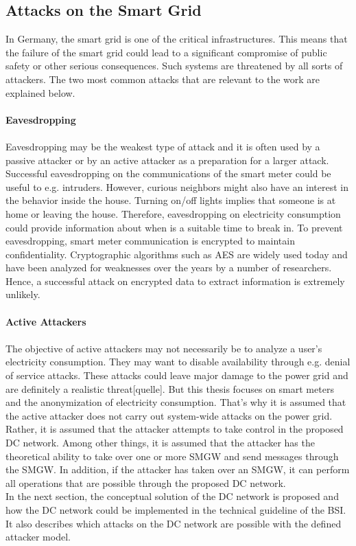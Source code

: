 \subsection{Attacks on the Smart Grid}
In Germany, the smart grid is one of the critical infrastructures. This means that the failure of the smart grid could lead to a significant compromise of public safety or other serious consequences. Such systems are threatened by all sorts of attackers. The two most common attacks that are relevant to the work are explained below.
\\
\\
\textbf{Eavesdropping}
\\
\\
Eavesdropping may be the weakest type of attack and it is often used by a passive attacker or by an active attacker as a preparation for a larger attack. Successful eavesdropping on the communications of the smart meter could be useful to e.g. intruders. However, curious neighbors might also have an interest in the behavior inside the house. Turning on/off lights implies that someone is at home or leaving the house. Therefore, eavesdropping on electricity consumption could provide information about when is a suitable time to break in. To prevent eavesdropping, smart meter communication is encrypted to maintain confidentiality. Cryptographic algorithms such as AES are widely used today and have been analyzed for weaknesses over the years by a number of researchers. Hence, a successful attack on encrypted data to extract information is extremely unlikely.
\\
\\
\textbf{Active Attackers}
\\
\\
The objective of active attackers may not necessarily be to analyze a user's electricity consumption. They may want to disable availability through e.g. denial of service attacks. These attacks could leave major damage to the power grid and are definitely a realistic threat[quelle]. But this thesis focuses on smart meters and the anonymization of electricity consumption. That's why it is assumed that the active attacker does not carry out system-wide attacks on the power grid. Rather, it is assumed that the attacker attempts to take control in the proposed DC network. Among other things, it is assumed that the attacker has the theoretical ability to take over one or more SMGW and send messages through the SMGW. In addition, if the attacker has taken over an SMGW, it can perform all operations that are possible through the proposed DC network.\\In the next section, the conceptual solution of the DC network is proposed and how the DC network could be implemented in the technical guideline of the BSI. It also describes which attacks on the DC network are possible with the defined attacker model.

\clearpage

